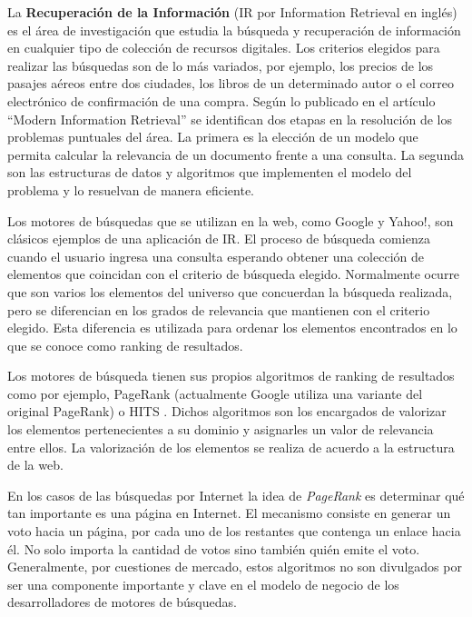 La \textbf{Recuperación de la Información} (IR por Information Retrieval en inglés) \cite{Baeza-Yates:1999:MIR:553876,Manning:2008:IIR:1394399,Zobel:2006:IFT:1132956.1132959} es el área de investigación que estudia la búsqueda y recuperación de información en cualquier tipo de colección de recursos digitales. Los criterios elegidos para realizar las búsquedas son de lo más variados, por ejemplo, los precios de los pasajes aéreos entre dos ciudades, los libros de un determinado autor o el correo electrónico de confirmación de una compra. Según lo publicado en el artículo ``Modern Information Retrieval'' \cite{Baeza-Yates:1999:MIR:553876} se identifican dos etapas en la resolución de los problemas puntuales del área. La primera es la elección de un modelo que permita calcular la relevancia de un documento frente a una consulta. La segunda son las estructuras de datos y algoritmos que implementen el modelo del problema y lo resuelvan de manera eficiente.

Los motores de búsquedas que se utilizan en la web, como Google y Yahoo!, son clásicos ejemplos de una aplicación de IR. El proceso de búsqueda comienza cuando el usuario ingresa una consulta esperando obtener una colección de elementos que coincidan con el criterio de búsqueda elegido. Normalmente ocurre que son varios los elementos del universo que concuerdan la búsqueda realizada, pero se diferencian en los grados de relevancia que mantienen con el criterio elegido. Esta diferencia es utilizada para ordenar los elementos encontrados en lo que se conoce como ranking de resultados.

Los motores de búsqueda tienen sus propios algoritmos de ranking de resultados como por ejemplo, PageRank (actualmente Google utiliza una variante del original PageRank) \cite{Brin:1998:ALH:297810.297827} o HITS \cite{Kleinberg:1999:ASH:324133.324140}. Dichos algoritmos son los encargados de valorizar los elementos pertenecientes a su dominio y asignarles un valor de relevancia entre ellos. La valorización de los elementos se realiza de acuerdo a la estructura de la web.

En los casos de las búsquedas por Internet la idea de \textit{PageRank} \cite{Brin:1998:ALH:297810.297827} es determinar qué tan importante es una página en Internet. El mecanismo consiste en generar un voto hacia un página, por cada uno de los restantes que contenga un enlace hacia él. No solo importa la cantidad de votos sino también quién emite el voto. Generalmente, por cuestiones de mercado, estos algoritmos no son divulgados por ser una componente importante y clave en el modelo de negocio de los desarrolladores de motores de búsquedas. 

